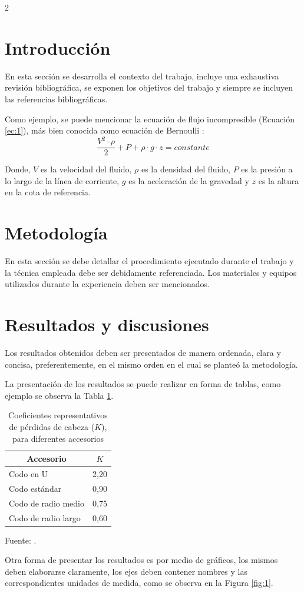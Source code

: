 \documentclass[11pt]{article}
\begin{document}
\begin{multicols}{2}
\section{Introducción}
En esta sección se desarrolla el contexto del trabajo, incluye una exhaustiva revisión bibliográfica, se exponen los objetivos del trabajo y siempre se incluyen las referencias bibliográficas. 

Como ejemplo, se puede mencionar la ecuación de flujo incompresible (Ecuación \ref{ec:1}), más bien conocida como ecuación de Bernoulli \citep{streeter}:
\begin{equation}\label{ec:1}
\dfrac{V^{2}\cdot \rho}{2}+P+\rho\cdot g \cdot z=constante
\end{equation}

Donde, $V$ es la velocidad del fluido, $\rho$ es la densidad del fluido, $P$ es la presión a lo largo de la línea de corriente, $g$ es la aceleración de la gravedad y $z$ es la altura en la cota de referencia.
\section{Metodología}

En esta sección se debe detallar el procedimiento ejecutado durante el trabajo y la técnica empleada debe ser debidamente referenciada. Los materiales y equipos utilizados durante la experiencia deben ser mencionados. 

\section{Resultados y discusiones}
Los resultados obtenidos deben ser presentados de manera ordenada, clara y concisa, preferentemente, en el mismo orden en el cual se planteó la metodología. 

La presentación de los resultados se puede realizar en forma de tablas, como ejemplo se observa la Tabla \ref{tab:tab1}.

\begin{table}[H]
    \centering
    \caption{Coeficientes representativos de pérdidas de cabeza ($K$), para diferentes accesorios}
\begin{tabular}{lr}
\hline
\multicolumn{1}{c}{Accesorio} & \multicolumn{1}{c}{$K$}\\
\hline
Codo en U & 2,20\\
Codo estándar & 0,90\\
Codo de radio medio & 0,75\\
Codo de radio largo & 0,60\\
\hline
\end{tabular}
    \label{tab:tab1}
    \begin{minipage}{\columnwidth}
    \centering Fuente: \citet{streeter}.
    \end{minipage}
\end{table}

Otra forma de presentar los resultados es por medio de gráficos, los mismos deben elaborarse claramente, los ejes deben contener nombres y las correspondientes unidades de medida, como se observa en la Figura \ref{fig:1}.
\end{multicols}
\end{document}
